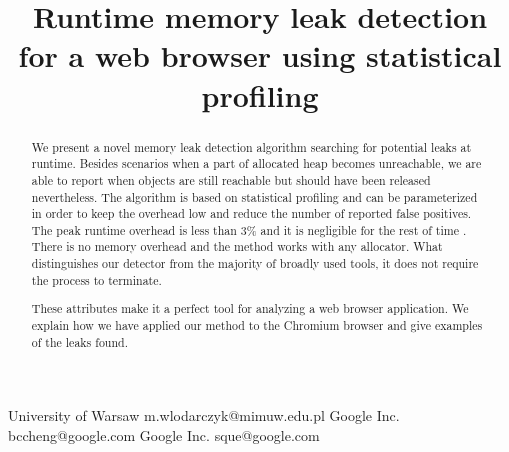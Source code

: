 \documentclass[preprint, numbers]{sigplanconf}
\newcommand{\comment}[1]{{\color{blue}{#1}}}
\newcommand{\todo}[1]{{\color{red}{(TODO: #1)}}}
\begin{document}
\setlength{\pdfpageheight}{\paperheight}
\setlength{\pdfpagewidth}{\paperwidth}




\title{Runtime memory leak detection for a web browser using statistical profiling}
\subtitle{}

           {University of Warsaw}
           {m.wlodarczyk@mimuw.edu.pl}
           {Google Inc.}
           {bccheng@google.com}
           {Google Inc.}
           {sque@google.com}

\maketitle

\begin{abstract}
We present a novel memory leak detection algorithm searching for potential
leaks at runtime.
Besides scenarios when a part of allocated heap becomes unreachable,
we are able to report when objects are still reachable but
should have been released nevertheless.
The algorithm is based on statistical profiling and can be parameterized in order to
keep the overhead low and reduce the number of reported false positives.
The peak runtime overhead is less than 3\% and it is negligible for the rest of time \todo{cite?}.
There is no memory overhead and the method works
with any allocator.
What distinguishes our detector from the majority of broadly used tools,
it does not require the process to terminate.

These attributes make it a perfect tool for analyzing a web browser application.
We explain how we have applied our method to the Chromium browser and give
examples of the leaks found.

	\comment{This is a draft. All comments about future changes are written in blue.
	Any changes to the authors list?}
	\todo{The red color is reserved for the author's private environment for todos.
	Remember to anonymize the paper before sending to ISMM.}
\end{abstract}
\end{document}
